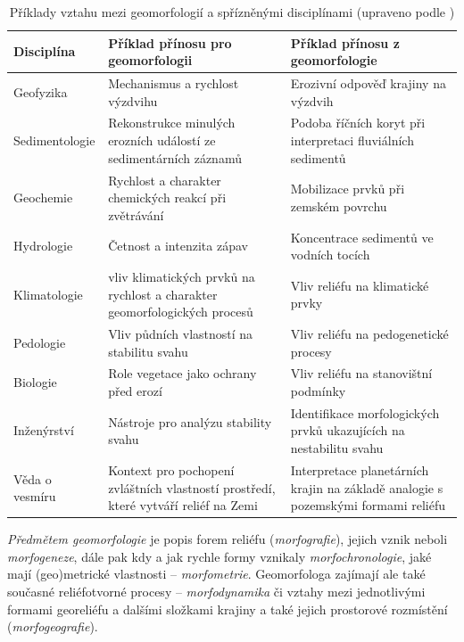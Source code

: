 \begin{table}[h]
	\begin{tabularx}{1\textwidth}{@{}lXX@{}}
		\toprule
		Disciplína   & Příklad přínosu pro geomorfologii                                         & Příklad přínosu z geomorfologie                                    \\ \midrule
		Geofyzika    & Mechanismus a rychlost výzdvihu                                           & Erozivní odpověď krajiny na výzdvih                                \\
		Sedimentologie &
		Rekonstrukce minulých erozních událostí ze sedimentárních záznamů &
		Podoba říčních koryt při interpretaci fluviálních sedimentů \\
		Geochemie    & Rychlost a charakter chemických reakcí při zvětrávání                     & Mobilizace prvků při zemském povrchu                               \\
		Hydrologie   & Četnost a intenzita zápav                                                 & Koncentrace sedimentů ve vodních tocích                            \\
		Klimatologie & vliv klimatických prvků na rychlost a charakter geomorfologických procesů & Vliv reliéfu na klimatické prvky                                   \\
		Pedologie    & Vliv půdních vlastností na stabilitu svahu                                & Vliv reliéfu na pedogenetické procesy                              \\
		Biologie     & Role vegetace jako ochrany před erozí                                     & Vliv reliéfu na stanovištní podmínky                               \\
		Inženýrství  & Nástroje pro analýzu stability svahu                                      & Identifikace morfologických prvků ukazujících na nestabilitu svahu \\
		Věda o vesmíru &
		Kontext pro pochopení zvláštních vlastností prostředí, které vytváří reliéf na Zemi &
		Interpretace planetárních krajin na základě analogie s pozemskými formami reliéfu \\ \bottomrule
	\end{tabularx}
	\caption{Příklady vztahu mezi geomorfologií a spřízněnými disciplínami (upraveno podle \textcite{summerfieldGlobalGeomorphologyIntroduction1999})}
	\label{tab:geom_a_dalsi}
\end{table}

\emph{Předmětem geomorfologie} je popis forem reliéfu (\emph{morfografie}), jejich vznik neboli \emph{morfogeneze}, dále pak kdy a jak rychle formy vznikaly \emph{morfochronologie}, jaké mají (geo)metrické vlastnosti -- \emph{morfometrie}. Geomorfologa zajímají ale také současné reliéfotvorné procesy -- \emph{morfodynamika} či vztahy mezi jednotlivými formami georeliéfu a dalšími složkami krajiny a také jejich prostorové rozmístění (\emph{morfogeografie}).

